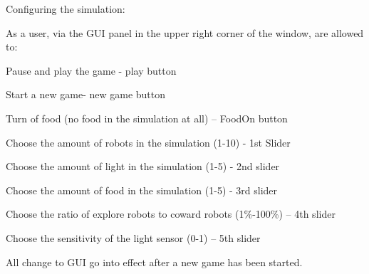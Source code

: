 Configuring the simulation\+:

As a user, via the G\+UI panel in the upper right corner of the window, are allowed to\+:


\begin{DoxyItemize}
\item Pause and play the game -\/ play button
\item Start a new game-\/ new game button
\item Turn of food (no food in the simulation at all) – Food\+On button
\item Choose the amount of robots in the simulation (1-\/10) -\/ 1st Slider
\item Choose the amount of light in the simulation (1-\/5) -\/ 2nd slider
\item Choose the amount of food in the simulation (1-\/5) -\/ 3rd slider
\item Choose the ratio of explore robots to coward robots (1\%-\/100\%) – 4th slider
\item Choose the sensitivity of the light sensor (0-\/1) – 5th slider
\end{DoxyItemize}

All change to G\+UI go into effect after a new game has been started. 